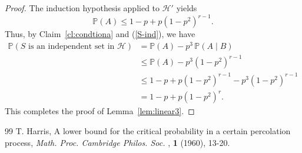 \documentclass[10pt,a4paper]{amsart}
\newcommand{\cH}{\mathcal{H}}
\begin{document}
\begin{proof}
The induction hypothesis applied to $\cH'$ yields
$$
\mathbb P(A)\le 1-p+p(1-p^2)^{r-1}.
$$
Thus, by Claim~\ref{cl:condtiona} and (\ref{S-ind}),  we have 
\begin{align*}
\mathbb P(S \text{ is an independent set  in } \cH)&=\mathbb P(A)-p^3\,\mathbb P(A\mid B)\\
&\le \mathbb P(A)-p^3(1-p^2)^{r-1}\\
&\le 1-p+p(1-p^2)^{r-1}-p^3(1-p^2)^{r-1}\\
&=1-p+p(1-p^2)^r.
\end{align*}
This completes the proof of Lemma~\ref{lem:linear3}.
\end{proof}

\begin{thebibliography}{99}
 T. Harris, A lower bound for the critical probability in a certain percolation process, \emph{Math. Proc. Cambridge Philos. Soc. }, \textbf{1} (1960), 13-20.
\end{thebibliography}
\end{document}
